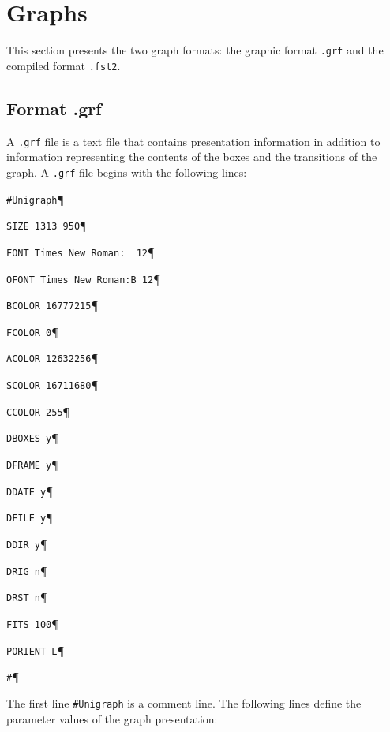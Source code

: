 \section{Graphs}
This section presents the two graph formats: the graphic format \verb+.grf+ and
the compiled format \verb+.fst2+.


\subsection{Format .grf}
A \verb+.grf+ file is a text file that contains presentation information in
addition to information representing the contents of the boxes and the
transitions of the graph. A \verb+.grf+ file begins with the following lines:

\bigskip
\verb+#Unigraph+\P

\verb+SIZE 1313 950+\P

\verb+FONT Times New Roman:  12+\P

\verb+OFONT Times New Roman:B 12+\P

\verb+BCOLOR 16777215+\P

\verb+FCOLOR 0+\P

\verb+ACOLOR 12632256+\P

\verb+SCOLOR 16711680+\P

\verb+CCOLOR 255+\P

\verb+DBOXES y+\P

\verb+DFRAME y+\P

\verb+DDATE y+\P

\verb+DFILE y+\P

\verb+DDIR y+\P

\verb+DRIG n+\P

\verb+DRST n+\P

\verb+FITS 100+\P

\verb+PORIENT L+\P

\verb+#+\P

\bigskip
\noindent The first line \verb+#Unigraph+ is a comment line. The following lines
define the parameter values of the graph presentation:

